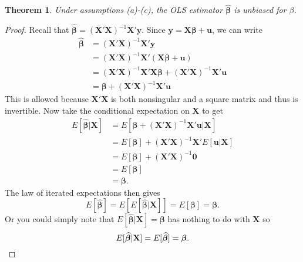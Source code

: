 \documentclass[12pt]{article}
\renewcommand{\vec}[1]{\mathbf{#1}}
\renewcommand{\hat}[1]{\widehat{#1}}
\newtheorem{theorem}{Theorem}
\theoremstyle{definition}
\begin{document}
\begin{theorem}
	Under assumptions (a)-(c), the OLS estimator $\bm{\hat{\beta}}$ is unbiased for $\beta$. 
\end{theorem}
\begin{proof}
	Recall that $\bm{\hat{\beta}}  = (\vec{X'X})^{-1}\vec{X}'\vec{y}$. Since $\vec{y}=\vec{X \bm{\beta} + u}$, we can write 
\begin{align*}
	\bm{\hat{\beta}} & =  (\vec{X'X})^{-1}\vec{X}'\vec{y} \\
		&=	 (\vec{X'X})^{-1}\vec{X}'(\vec{X \bm{\beta} + u}) \\
		&=	 (\vec{X'X})^{-1}\vec{X}'\vec{X \bm{\beta}} + (\vec{X'X})^{-1}\vec{X}'\vec{u} \\
		&=	\vec{\bm{\beta}} + (\vec{X'X})^{-1}\vec{X}'\vec{u} 
\end{align*}
This is allowed because $\vec{X'X}$ is both nonsingular and a square matrix and thus is invertible. Now take the conditional expectation on $\vec{X}$ to get 
\begin{align*}
	E\left[ \hat{\bm{\beta}} \big\vert \vec{X} \right] & = E\left[ \vec{\bm{\beta}} + (\vec{X'X})^{-1}\vec{X}'\vec{u}  \big\vert \vec{X} \right]\\
	&=	E\left[ \vec{\bm{\beta}}\right] + (\vec{X'X})^{-1}\vec{X}'E\left[\vec{u}  \big\vert \vec{X} \right]\\
	&=	E\left[ \vec{\bm{\beta}}\right] + (\vec{X'X})^{-1}\vec{0}\\
	&= E\left[ \vec{\bm{\beta}}\right]\\
	& = \bm{\beta}.
\end{align*}
The law of iterated expectations then gives
\[	E[\bm{\hat{\beta}}] = E\left[ E[\bm{\hat{\beta}} | \vec{X}] \right] = E[ \bm{\beta}] = \bm{\beta}.\]	
Or you could simply  note that $E[\bm{\hat{\beta}} | \vec{X}
]=\bm{\beta}$ has nothing to do with $\vec{X}$ so 
\[	E[\bm{\hat{\beta}} | \vec{X}	]=E[ \bm{\hat{\beta}}] = \bm{\beta}.  \qedhere \]
\end{proof}
\end{document}
